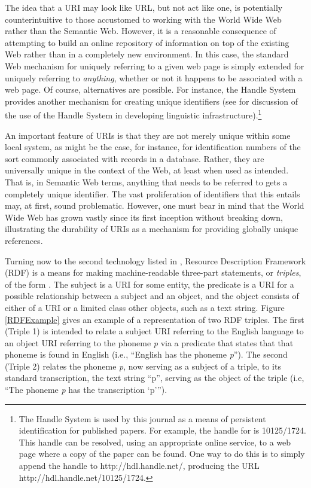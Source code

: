 The idea that a URI may look like URL, but not act like one, is potentially
counterintuitive to those accustomed to working with the World Wide Web rather
than the Semantic Web. However, it is a reasonable consequence of attempting to
build an online repository of information on top of the existing Web rather than
in a completely new environment. In this case, the standard Web mechanism for
uniquely referring to a given web page is simply extended for uniquely referring
to \emph{anything}, whether or not it happens to be associated with a web page.
Of course, alternatives are possible. For instance, the Handle System provides
another mechanism for creating unique identifiers (see
 for discussion of the use of the Handle System in
developing linguistic infrastructure).{\footnote{The Handle System is used by
this journal as a means of persistent identification for published papers. For
example, the handle for  is 10125/1724. This handle can be
resolved, using an appropriate online service, to a web page where a copy of the
paper can be found. One way to do this is to simply append the handle to
http://hdl.handle.net/, producing the URL http://hdl.handle.net/10125/1724.}}

An important feature of URIs is that they are not merely unique within some
local system, as might be the case, for instance, for identification numbers of
the sort commonly associated with records in a database. Rather, they are
universally unique in the context of the Web, at least when used as intended.
That is, in Semantic Web terms, anything that needs to be referred to gets a
completely unique identifier. The vast proliferation of identifiers that this
entails may, at first, sound problematic. However, one must bear in mind
that the World Wide Web has grown vastly since its first inception without
breaking down, illustrating the durability of URIs as a mechanism for
providing globally unique references.

Turning now to the second technology listed in , Resource
Description Framework (RDF) is a means for making machine-readable three-part
statements, or \emph{triples}, of the form {}.
The subject is a URI for some entity, the predicate is a URI for a possible
relationship between a subject and an object, and the object consists of either
of a URI or a limited class other objects, such as a text string. Figure
\ref{RDFExample} gives an example of a representation of two RDF triples. The
first (Triple 1) is intended to relate a subject URI referring to the English
language to an object URI referring to the phoneme \emph{p} via a predicate that
states that that phoneme is found in English (i.e., ``English has the phoneme
\emph{p}''). The second (Triple 2) relates the phoneme \emph{p}, now serving as
a subject of a triple, to its standard transcription, the text string ``p'',
serving as the object of the triple (i.e, ``The phoneme \emph{p} has the
transcription `p''').



